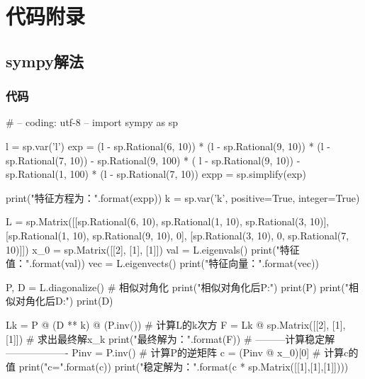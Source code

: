 \chapter{代码附录}
\section{sympy解法}
\subsection{代码}
\begin{python}
# -- coding: utf-8 --
import sympy as sp

l = sp.var('l')
exp = (l - sp.Rational(6, 10)) * (l - sp.Rational(9, 10)) * (l - sp.Rational(7, 10)) - sp.Rational(9, 100) * (
        l - sp.Rational(9, 10)) - sp.Rational(1, 100) * (l - sp.Rational(7, 10))
expp = sp.simplify(exp)

print("特征方程为：{}".format(expp))
k = sp.var('k', positive=True, integer=True)

L = sp.Matrix([[sp.Rational(6, 10), sp.Rational(1, 10), sp.Rational(3, 10)],
               [sp.Rational(1, 10), sp.Rational(9, 10), 0],
               [sp.Rational(3, 10), 0, sp.Rational(7, 10)]])
x_0 = sp.Matrix([[2], [1], [1]])
val = L.eigenvals()
print("特征值：{}".format(val))
vec = L.eigenvects()
print("特征向量：{}".format(vec))

P, D = L.diagonalize()  # 相似对角化
print("相似对角化后P:")
print(P)
print("相似对角化后D:")
print(D)

Lk = P @ (D ** k) @ (P.inv())  # 计算L的k次方
F = Lk @ sp.Matrix([[2], [1], [1]])  # 求出最终解x_k
print("最终解为：\n{}".format(F))
# ---------计算稳定解-------------------
Pinv = P.inv()  # 计算P的逆矩阵
c = (Pinv @ x_0)[0]  # 计算c的值
print("c={}".format(c))
print("稳定解为：\n{}".format(c * sp.Matrix([[1],[1],[1]])))
\end{python}
